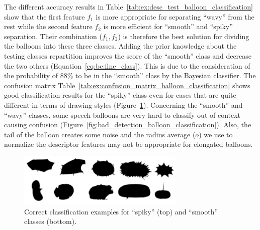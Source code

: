 The different accuracy results in Table~\ref{tab:ex:desc_test_balloon_classification} show that the first feature $f_1$ is more appropriate for separating ``wavy'' from the rest while the second feature $f_2$ is more efficient for ``smooth'' and ``spiky'' separation.
Their combination ($f_1, f_2$) is therefore the best solution for dividing the balloons into these three classes.
Adding the prior knowledge about the testing classes repartition improves the score of the ``smooth'' class and decrease the two others (Equation~\ref{eq:be:fine_class}).
This is due to the consideration of the probability of 88\% to be in the ``smooth'' class by the Bayesian classifier.
The confusion matrix Table~\ref{tab:ex:confusion_matrix_balloon_classification} shows good classification results for the ``spiky'' class even for cases that are quite different in terms of drawing styles (Figure~\ref{fig:good_detection_balloon_classification}).
Concerning the ``smooth'' and ``wavy'' classes, some speech balloons are very hard to classify out of context causing confusion (Figure~\ref{fig:bad_detection_balloon_classification}).
Also, the tail of the balloon creates some noise and the radius average ($\bar{o}$) we use to normalize the descriptor features may not be appropriate for elongated balloons.


  \begin{figure}[h]  %
    \centering
    \includegraphics[trim = 0mm 0mm 0mm 0mm, clip, width=300px]{good_detection.png}
    \caption[Correct classification examples for ``spiky'' and ``smooth'' classes]{Correct classification examples for ``spiky'' (top) and ``smooth'' classes (bottom).}
    \label{fig:good_detection_balloon_classification}
  \end{figure}


